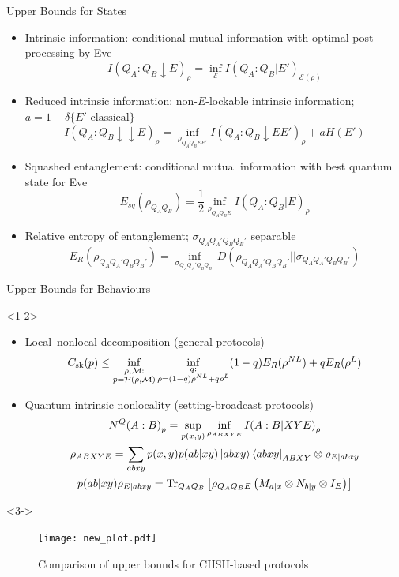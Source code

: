 \documentclass[xcolor=dvipsnames]{beamer}
\newcommand{\?}{\mathrel{?}} %
\newcommand{\Tr}{\mathrm{Tr}} %
\newcommand{\sM}{\mathcal{M}}
\newcommand{\cE}{\mathcal{E}}
\newcommand{\cP}{\mathcal{P}}
\newcommand{\sk}{\rm sk}
\begin{document}

\begin{frame}{Upper Bounds for States}
  \begin{itemize}[<+->]
    \item Intrinsic information: conditional mutual information with optimal post-processing by Eve
      \[ I{(Q_A : Q_B \downarrow E)}_{\rho} = \inf_{\cE} I{(Q_A : Q_B|E')}_{\cE(\rho)} \]
    \item Reduced intrinsic information: non-\(E\)-lockable intrinsic information; \(a = 1 + \delta\{E' \text{ classical}\}\)
      \[ 
        I{(Q_A : Q_B \downarrow\downarrow E)}_{\rho} = \inf_{\rho_{Q_A Q_B EE'}}
        I{(Q_A : Q_B \downarrow EE')}_{\rho} + aH(E')
 \]
    \item Squashed entanglement: conditional mutual information with best quantum state for Eve
      \[ E_{sq}(\rho_{Q_A Q_B}) = \frac{1}{2} \inf_{\rho_{Q_A Q_B E}} I{(Q_A:Q_B|E)}_{\rho} \]
    \item Relative entropy of entanglement; \(\sigma_{Q_AQ_A'Q_BQ_B'}\) separable
      \[ E_R\left({\rho_{Q_AQ_A'Q_BQ_B'}}\right) = \inf_{\sigma_{Q_AQ_A'Q_BQ_B'}} D(\rho_{Q_AQ_A'Q_BQ_B'}||\sigma_{Q_AQ_A'Q_BQ_B'}) \]
  \end{itemize}
\end{frame}

\begin{frame}{Upper Bounds for Behaviours}
  \begin{onlyenv}<1-2>
    \begin{itemize}[<+->]
      \item Local--nonlocal decomposition (general protocols)
        \[ C_{\sk}(p) \leq \inf_{\substack{\rho, \sM : \\ p = \cP(\rho, \sM) }} \inf_{\substack{q : \\ \rho = (1-q)\rho^{NL} + q\rho^L}} (1-q) E_R(\rho^{NL}) + q E_R(\rho^L) \]
      \item Quantum intrinsic nonlocality (setting-broadcast protocols)
        \begin{gather*}
          N^Q{(A:B)}_p = \sup_{p(x,y)} \inf_{\rho_{ABXYE}} I{(A:B|XYE)}_{\rho} \\
          \rho_{ABXYE} = \sum_{abxy} p(x,y) p(ab|xy) \ket{abxy}\bra{abxy}_{ABXY} \otimes \rho_{E|abxy} \\
          p(ab|xy) \rho_{E|abxy} = \Tr_{Q_A Q_B}\left[\rho_{Q_A Q_B E} \left(M_{a|x} \otimes N_{b|y} \otimes I_{E}\right) \right]
        \end{gather*}
    \end{itemize}
  \end{onlyenv}
  \begin{onlyenv}<3->
      \begin{figure}
        \centering
        \texttt{[image: new\_plot.pdf]}
        \caption{Comparison of upper bounds for CHSH-based protocols}
      \end{figure}
  \end{onlyenv}
\end{frame}
\end{document}
